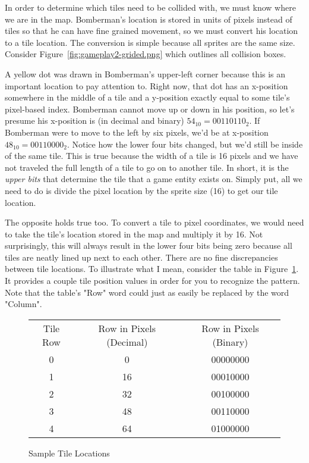 \documentclass[10pt,a4paper]{article}
\begin{document}
In order to determine which tiles need to be collided with, we must know where we are in the map. Bomberman's location is stored in units of pixels instead of tiles so that he can have fine grained movement, so we must convert his location to a tile location. The conversion is simple because all sprites are the same size. Consider Figure~\ref{fig:gameplay2-grided.png} which outlines all collision boxes.

A yellow dot was drawn in Bomberman's upper-left corner because this is an important location to pay attention to. Right now, that dot has an x-position somewhere in the middle of a tile and a y-position exactly equal to some tile's pixel-based index. Bomberman cannot move up or down in his position, so let's presume his x-position is (in decimal and binary) $ 54_{10} = 00110110_2 $. If Bomberman were to move to the left by six pixels, we'd be at x-position $ 48_{10} = 00110000_2 $. Notice how the lower four bits changed, but we'd still be inside of the same tile. This is true because the width of a tile is 16 pixels and we have not traveled the full length of a tile to go on to another tile. In short, it is the \emph{upper bits} that determine the tile that a game entity exists on. Simply put, all we need to do is divide the pixel location by the sprite size (16) to get our tile location.

The opposite holds true too. To convert a tile to pixel coordinates, we would need to take the tile's location stored in the map and multiply it by 16. Not surprisingly, this will always result in the lower four bits being zero because all tiles are neatly lined up next to each other. There are no fine discrepancies between tile locations. To illustrate what I mean, consider the table in Figure~\ref{fig:grid-vals}. It provides a couple tile position values in order for you to recognize the pattern. Note that the table's "Row" word could just as easily be replaced by the word "Column".

\begin{figure}[H]
\centering
\begin{tabular}{c c c}
Tile Row & Row in Pixels (Decimal) & Row in Pixels (Binary) \\
0 & 0 & 00000000 \\
1 & 16 & 00010000 \\
2 & 32 & 00100000 \\
3 & 48 & 00110000 \\
4 & 64 & 01000000 \\
\end{tabular}
\caption{Sample Tile Locations}
\label{fig:grid-vals}
\end{figure}
\end{document}
